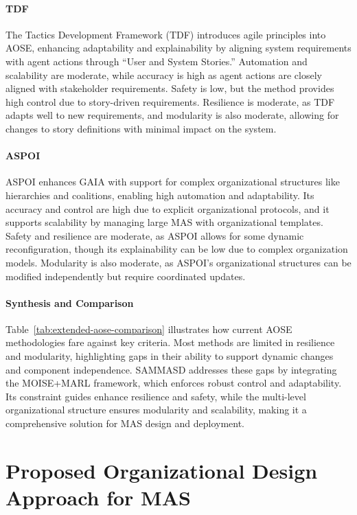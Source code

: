 \documentclass[sigconf,anonymous]{aamas}
\begin{document}
\paragraph{TDF}
The Tactics Development Framework (TDF) \cite{winikoff2021tdf} introduces agile principles into AOSE, enhancing adaptability and explainability by aligning system requirements with agent actions through “User and System Stories.” Automation and scalability are moderate, while accuracy is high as agent actions are closely aligned with stakeholder requirements. Safety is low, but the method provides high control due to story-driven requirements. Resilience is moderate, as TDF adapts well to new requirements, and modularity is also moderate, allowing for changes to story definitions with minimal impact on the system.

\paragraph{ASPOI}
ASPOI \cite{isern2010organizational} enhances GAIA with support for complex organizational structures like hierarchies and coalitions, enabling high automation and adaptability. Its accuracy and control are high due to explicit organizational protocols, and it supports scalability by managing large MAS with organizational templates. Safety and resilience are moderate, as ASPOI allows for some dynamic reconfiguration, though its explainability can be low due to complex organization models. Modularity is also moderate, as ASPOI's organizational structures can be modified independently but require coordinated updates.

\paragraph{Synthesis and Comparison}
Table~\ref{tab:extended-aose-comparison} illustrates how current AOSE methodologies fare against key criteria. Most methods are limited in resilience and modularity, highlighting gaps in their ability to support dynamic changes and component independence. SAMMASD addresses these gaps by integrating the MOISE+MARL framework, which enforces robust control and adaptability. Its constraint guides enhance resilience and safety, while the multi-level organizational structure ensures modularity and scalability, making it a comprehensive solution for MAS design and deployment.



\section{Proposed Organizational Design Approach for MAS}
\label{sec:sammasd_presentation}
\end{document}
